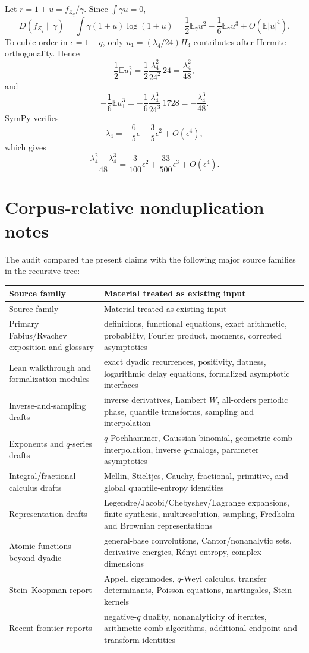 \documentclass[11pt,oneside]{article}
\theoremstyle{definition}
\theoremstyle{remark}
\newcommand{\E}{\mathbb E}
\begin{document}
Let $r=1+u=f_{Z_q}/\gamma$.  Since $\int\gamma u=0$,
\[
 D(f_{Z_q}\|\gamma)
 =\int\gamma(1+u)\log(1+u)
 =\frac12\E_\gamma u^2-\frac16\E_\gamma u^3+O(\E|u|^4).
\]
To cubic order in $\epsilon=1-q$, only
$u_1=(\lambda_4/24)H_4$ contributes after Hermite orthogonality.  Hence
\[
 \frac12\E u_1^2
 =\frac12\frac{\lambda_4^2}{24^2}\,24
 =\frac{\lambda_4^2}{48},
\]
and
\[
 -\frac16\E u_1^3
 =-\frac16\frac{\lambda_4^3}{24^3}\,1728
 =-\frac{\lambda_4^3}{48}.
\]
SymPy verifies
\[
 \lambda_4=-\frac65\epsilon-\frac35\epsilon^2+O(\epsilon^4),
\]
which gives
\[
 \frac{\lambda_4^2-\lambda_4^3}{48}
 =\frac3{100}\epsilon^2+\frac{33}{500}\epsilon^3+O(\epsilon^4).
\]

\section{Corpus-relative nonduplication notes}
\label{app:audit}

The audit compared the present claims with the following major source families in
the recursive tree:
\begin{longtable}{@{}p{}p{}@{}}
\toprule
Source family & Material treated as existing input \\
\midrule
\endfirsthead
\toprule
Source family & Material treated as existing input \\
\midrule
\endhead
Primary Fabius/Rvachev exposition and glossary & definitions, functional equations, exact arithmetic, probability, Fourier product, moments, corrected asymptotics \\
Lean walkthrough and formalization modules & exact dyadic recurrences, positivity, flatness, logarithmic delay equations, formalized asymptotic interfaces \\
Inverse-and-sampling drafts & inverse derivatives, Lambert $W$, all-orders periodic phase, quantile transforms, sampling and interpolation \\
Exponents and $q$-series drafts & $q$-Pochhammer, Gaussian binomial, geometric comb interpolation, inverse $q$-analogs, parameter asymptotics \\
Integral/fractional-calculus drafts & Mellin, Stieltjes, Cauchy, fractional, primitive, and global quantile-entropy identities \\
Representation drafts & Legendre/Jacobi/Chebyshev/Lagrange expansions, finite synthesis, multiresolution, sampling, Fredholm and Brownian representations \\
Atomic functions beyond dyadic & general-base convolutions, Cantor/nonanalytic sets, derivative energies, R\'enyi entropy, complex dimensions \\
Stein--Koopman report & Appell eigenmodes, $q$-Weyl calculus, transfer determinants, Poisson equations, martingales, Stein kernels \\
Recent frontier reports & negative-$q$ duality, nonanalyticity of iterates, arithmetic-comb algorithms, additional endpoint and transform identities \\
\bottomrule
\end{longtable}
\end{document}
